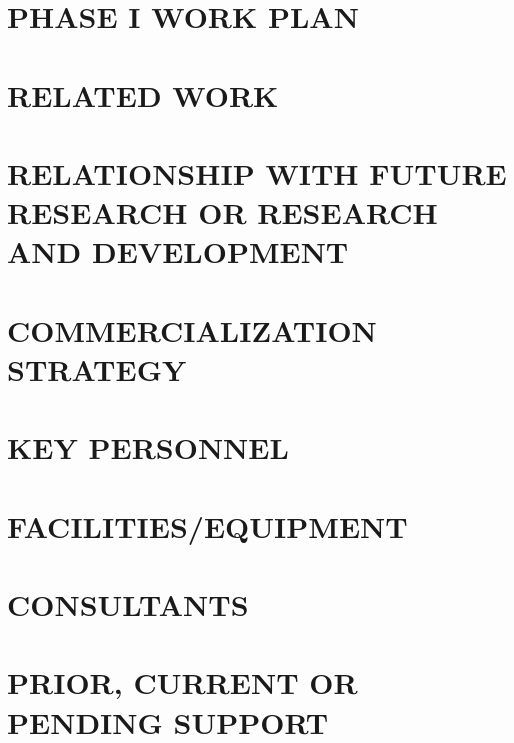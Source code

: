 \documentclass[letterpaper,11pt,onecolumn]{article}
\begin{document}
\section{PHASE I WORK PLAN}

\section{RELATED WORK}

\section{RELATIONSHIP WITH FUTURE RESEARCH OR RESEARCH AND DEVELOPMENT}

\section{COMMERCIALIZATION STRATEGY}

\section{KEY PERSONNEL}

\section{FACILITIES/EQUIPMENT}

\section{CONSULTANTS}

\section{PRIOR, CURRENT OR PENDING SUPPORT}



\end{document}
